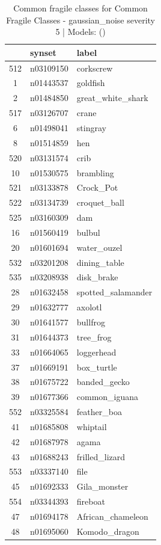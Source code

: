 \begin{table}
\caption{Common fragile classes for Common Fragile Classes - gaussian_noise severity 5 | Models: ()}
\label{tab:Common Fragile Classes - gaussian_noise severity 5_d41d8cd9}
\begin{tabular}{cll}
\toprule
 & synset & label \\
\midrule
512 & n03109150 & corkscrew \\
1 & n01443537 & goldfish \\
2 & n01484850 & great_white_shark \\
517 & n03126707 & crane \\
6 & n01498041 & stingray \\
8 & n01514859 & hen \\
520 & n03131574 & crib \\
10 & n01530575 & brambling \\
521 & n03133878 & Crock_Pot \\
522 & n03134739 & croquet_ball \\
525 & n03160309 & dam \\
16 & n01560419 & bulbul \\
20 & n01601694 & water_ouzel \\
532 & n03201208 & dining_table \\
535 & n03208938 & disk_brake \\
28 & n01632458 & spotted_salamander \\
29 & n01632777 & axolotl \\
30 & n01641577 & bullfrog \\
31 & n01644373 & tree_frog \\
33 & n01664065 & loggerhead \\
37 & n01669191 & box_turtle \\
38 & n01675722 & banded_gecko \\
39 & n01677366 & common_iguana \\
552 & n03325584 & feather_boa \\
41 & n01685808 & whiptail \\
42 & n01687978 & agama \\
43 & n01688243 & frilled_lizard \\
553 & n03337140 & file \\
45 & n01692333 & Gila_monster \\
554 & n03344393 & fireboat \\
47 & n01694178 & African_chameleon \\
48 & n01695060 & Komodo_dragon \\

\end{tabular}
\end{table}
